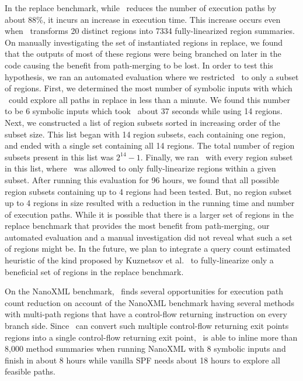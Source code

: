 In the replace benchmark, while \tool\ reduces the number of execution paths by about 88\%, it incurs an increase in
execution time.
%
This increase occurs even when \tool\ transforms 20 distinct regions into 7334 fully-linearized region summaries.
%
On manually investigating the set of instantiated regions in replace, we found that the outputs of most of these
regions were being branched on later in the code causing the benefit from path-merging to be lost.
%
In order to test this hypothesis, we ran an automated evaluation where we restricted \tool\ to only a subset of
regions.
%
First, we determined the most number of symbolic inputs with which \tool\ could explore all paths in replace in less
than a minute.
%
We found this number to be 6 symbolic inputs which took \tool\ about 37 seconds while using 14 regions.
%
Next, we constructed a list of region subsets sorted in increasing order of the subset size.
%
This list began with 14 region subsets, each containing one region, and ended with a single set containing all 14 regions.
%
The total number of region subsets present in this list was $2^{14}-1$.
%
Finally, we ran \tool\ with every region subset in this list, where \tool\ was allowed to only fully-linearize regions
within a given subset.
%
After running this evaluation for 96 hours, we found that all possible region subsets containing up to 4 regions had
been tested.
%
But, no region subset up to 4 regions in size resulted with a reduction in the running time and number of execution
paths.
%
While it is possible that there is a larger set of regions in the replace benchmark that provides the most benefit
from path-merging, our automated evaluation and a manual investigation did not reveal what such a set of regions might be.
%
In the future, we plan to integrate a query count estimated heuristic of the kind proposed by
Kuznetsov et al.~\cite{kuznetsov} to fully-linearize only a beneficial set of regions in the replace benchmark.

On the NanoXML benchmark, \tool\ finds several opportunities for execution path count reduction on account of the
NanoXML benchmark having several methods with multi-path regions that have a control-flow returning instruction on every
branch side.
%
Since \tool\ can convert such multiple control-flow returning exit points regions into a single control-flow
returning exit point, \tool\ is able to inline more than 8,000 method summaries when running NanoXML with 8 symbolic
inputs and finish in about 8 hours while vanilla SPF needs about 18 hours to explore all feasible paths.

